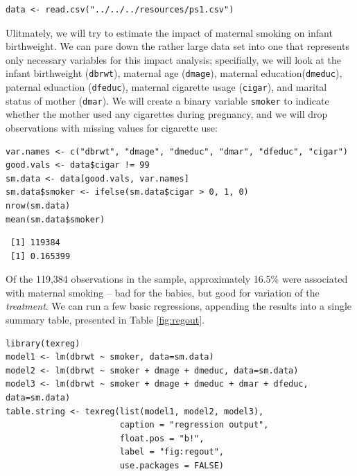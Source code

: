 \documentclass{article}
\begin{document}
\begin{verbatim}
data <- read.csv("../../../resources/ps1.csv")
\end{verbatim}

Ulitmately, we will try to estimate the impact of maternal smoking on
infant birthweight.  We can pare down the rather large data set into
one that represents only necessary variables for this impact analysis;
specifially, we will look at the infant birthweight (\texttt{dbrwt}),
maternal age (\texttt{dmage}), maternal education(\texttt{dmeduc}), paternal
eduaction (\texttt{dfeduc}), maternal cigarette usage (\texttt{cigar}), and marital
status of mother (\texttt{dmar}).  We will create a binary variable \texttt{smoker}
to indicate whether the mother used any cigarettes during pregnancy,
and we will drop observations with missing values for cigarette use:


\begin{verbatim}
var.names <- c("dbrwt", "dmage", "dmeduc", "dmar", "dfeduc", "cigar")
good.vals <- data$cigar != 99
sm.data <- data[good.vals, var.names]
sm.data$smoker <- ifelse(sm.data$cigar > 0, 1, 0)
nrow(sm.data)
mean(sm.data$smoker)
\end{verbatim}

\begin{verbatim}
 [1] 119384
 [1] 0.165399
\end{verbatim}

Of the 119,384 observations in the sample, approximately 16.5\% were
associated with maternal smoking -- bad for the babies, but good for
variation of the \emph{treatment}.  We can run a few basic regressions,
appending the results into a single summary table, presented in Table
\ref{fig:regout}.


\begin{verbatim}
library(texreg)
model1 <- lm(dbrwt ~ smoker, data=sm.data)
model2 <- lm(dbrwt ~ smoker + dmage + dmeduc, data=sm.data)
model3 <- lm(dbrwt ~ smoker + dmage + dmeduc + dmar + dfeduc, data=sm.data)
table.string <- texreg(list(model1, model2, model3), 
                       caption = "regression output",
                       float.pos = "b!",
                       label = "fig:regout",
                       use.packages = FALSE)
\end{verbatim}
\end{document}
